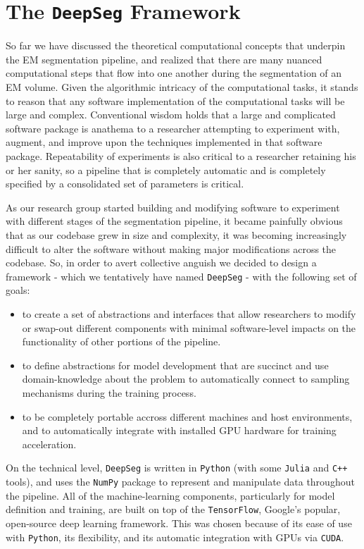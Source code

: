\chapter{The \texttt{DeepSeg} Framework}
So far we have discussed the theoretical computational concepts that underpin the EM segmentation pipeline, and realized that there are many nuanced computational steps that flow into one another during the segmentation of an EM volume. Given the algorithmic intricacy of the computational tasks, it stands to reason that any software implementation of the computational tasks will be large and complex. Conventional wisdom holds that a large and complicated software package is anathema to a researcher attempting to experiment with, augment, and improve upon the techniques implemented in that software package. Repeatability of experiments is also critical to a researcher retaining his or her sanity, so a pipeline that is completely automatic and is completely specified by a consolidated set of parameters is critical.

As our research group started building and modifying software to experiment with different stages of the segmentation pipeline, it became painfully obvious that as our codebase grew in size and complexity, it was becoming increasingly difficult to alter the software without making major modifications across the codebase. So, in order to avert collective anguish we decided to design a framework - which we tentatively have named \texttt{DeepSeg} - with the following set of goals:

\begin{itemize}
	\item to create a set of abstractions and interfaces that allow researchers to modify or swap-out different components with minimal software-level impacts on the functionality of other portions of the pipeline.
	\item to define abstractions for model development that are succinct and use domain-knowledge about the problem to automatically connect to sampling mechanisms during the training process. 
	\item to be completely portable accross different machines and host environments, and to automatically integrate with installed GPU hardware for training acceleration.
\end{itemize}

On the technical level, \texttt{DeepSeg} is written in \texttt{Python} (with some \texttt{Julia} and \texttt{C++} tools), and uses the \texttt{NumPy} package to represent and manipulate data throughout the pipeline. All of the machine-learning components, particularly for model definition and training, are built on top of the \texttt{TensorFlow}, Google's popular, open-source deep learning framework\cite{Abadi}. This was chosen because of its ease of use with \texttt{Python}, its flexibility, and its automatic integration with GPUs via \texttt{CUDA}.

